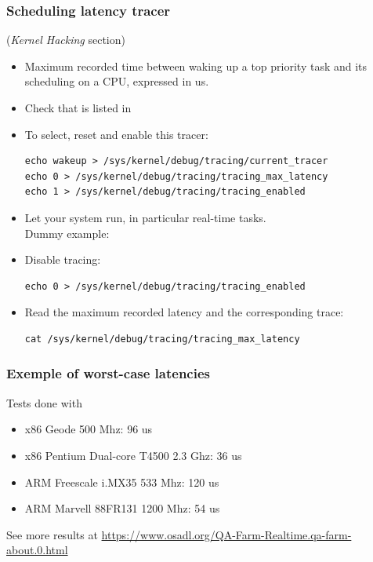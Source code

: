 \begin{frame}[fragile]
  \frametitle{Scheduling latency tracer}
  \fontsize{9}{9}\selectfont
   ({\em Kernel Hacking} section)
  \begin{itemize}
  \item Maximum recorded time between waking up a top priority task
    and its scheduling on a CPU, expressed in us.
  \item Check that  is listed in
  \item To select, reset and enable this tracer:
    \begin{block}{}
\begin{verbatim}
echo wakeup > /sys/kernel/debug/tracing/current_tracer
echo 0 > /sys/kernel/debug/tracing/tracing_max_latency
echo 1 > /sys/kernel/debug/tracing/tracing_enabled
\end{verbatim}
    \end{block}
  \item Let your system run, in particular real-time tasks.\\
    Dummy example: 
  \item Disable tracing:\\
    \begin{block}{}
\begin{verbatim}
echo 0 > /sys/kernel/debug/tracing/tracing_enabled
\end{verbatim}
    \end{block}{}
  \item Read the maximum recorded latency and the corresponding trace:\\
    \begin{block}{}
\begin{verbatim}
cat /sys/kernel/debug/tracing/tracing_max_latency
\end{verbatim}
    \end{block}{}
  \end{itemize}
\end{frame}
\begin{frame}
  \frametitle{Exemple of worst-case latencies}
  Tests done with 
  \begin{itemize}
  \item x86 Geode 500 Mhz: 96 us
  \item x86 Pentium Dual-core T4500 2.3 Ghz: 36 us
  \item ARM Freescale i.MX35 533 Mhz: 120 us
  \item ARM Marvell 88FR131 1200 Mhz: 54 us
  \end{itemize}
  See more results at
  \url{https://www.osadl.org/QA-Farm-Realtime.qa-farm-about.0.html}
\end{frame}

